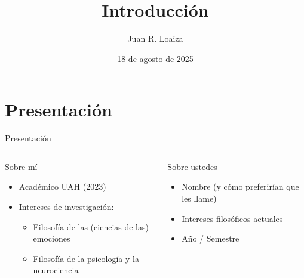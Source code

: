 \documentclass[%
  9pt,
  spanish, %
  ignorenonframetext,
  aspectratio=169, %
]{beamer}
\title{Introducción}
\author{Juan R. Loaiza}
\date{18 de agosto de 2025}
\institute{Departamento de Filosofía · Universidad Alberto Hurtado}
\providecommand{\tightlist}{}
\begin{document}

\frame{\titlepage}




\section{Presentación}\label{presentaciuxf3n}

\begin{frame}{Presentación}
  \begin{columns}[T,onlytextwidth]
    \begin{column}{0.48\linewidth}
      \begin{block}{Sobre mí}
        \protect{}\label{sobre-muxed}
        \begin{itemize}
            \tightlist
          \item
            Académico UAH (2023)
          \item
            Intereses de investigación:

            \begin{itemize}
                \tightlist
              \item
                Filosofía de las (ciencias de las) emociones
              \item
                Filosofía de la psicología y la neurociencia
            \end{itemize}
        \end{itemize}
      \end{block}
    \end{column}

    \begin{column}{0.48\linewidth}
      \begin{block}{Sobre ustedes}
        \protect{}\label{sobre-ustedes}
        \begin{itemize}
            \tightlist
          \item
            Nombre (y cómo preferirían que les llame)
          \item
            Intereses filosóficos actuales
          \item
            Año / Semestre
        \end{itemize}
      \end{block}
    \end{column}
  \end{columns}


\end{frame}
\end{document}
